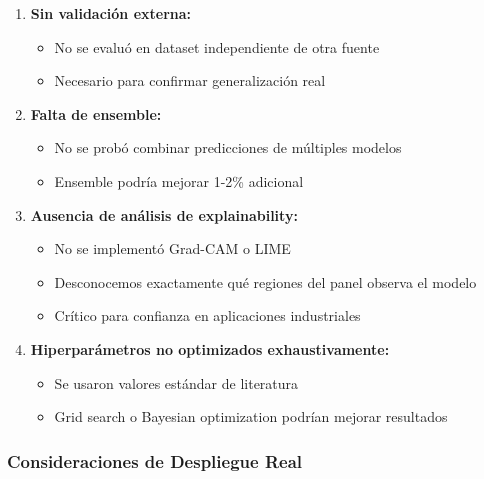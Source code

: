 \documentclass[11pt, a4paper]{article}
\begin{document}
\begin{enumerate}
    \item \textbf{Sin validación externa:}
    \begin{itemize}
        \item No se evaluó en dataset independiente de otra fuente
        \item Necesario para confirmar generalización real
    \end{itemize}
    
    \item \textbf{Falta de ensemble:}
    \begin{itemize}
        \item No se probó combinar predicciones de múltiples modelos
        \item Ensemble podría mejorar 1-2\% adicional
    \end{itemize}
    
    \item \textbf{Ausencia de análisis de explainability:}
    \begin{itemize}
        \item No se implementó Grad-CAM o LIME
        \item Desconocemos exactamente qué regiones del panel observa el modelo
        \item Crítico para confianza en aplicaciones industriales
    \end{itemize}
    
    \item \textbf{Hiperparámetros no optimizados exhaustivamente:}
    \begin{itemize}
        \item Se usaron valores estándar de literatura
        \item Grid search o Bayesian optimization podrían mejorar resultados
    \end{itemize}
\end{enumerate}

\subsubsection{Consideraciones de Despliegue Real}
\end{document}
